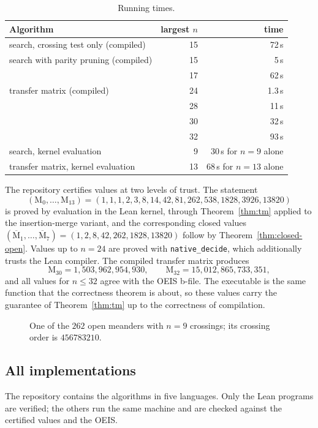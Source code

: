 \documentclass[11pt]{amsart}
\theoremstyle{definition}
\theoremstyle{remark}
\newcommand{\Open}{\mathrm{M}}
\newcommand{\Closed}{\overline{\mathrm{M}}}
\newcommand{\code}[1]{\texttt{#1}}
\begin{document}
\begin{table}[t]
\centering
\begin{tabular}{lrr}
\toprule
Algorithm & largest $n$ & time \\
\midrule
search, crossing test only (compiled)   & 15 & 72\,s \\
search with parity pruning (compiled)   & 15 & 5\,s \\
                                         & 17 & 62\,s \\
transfer matrix (compiled)              & 24 & 1.3\,s \\
                                         & 28 & 11\,s \\
                                         & 30 & 32\,s \\
                                         & 32 & 93\,s \\
\midrule
search, kernel evaluation                & 9  & 30\,s for $n=9$ alone \\
transfer matrix, kernel evaluation       & 13 & 68\,s for $n=13$ alone \\
\bottomrule
\end{tabular}
\caption{Running times.}\label{tab:perf}
\end{table}

The repository certifies values at two levels of trust. The statement
\[
  (\Open_0,\dots,\Open_{13}) = (1,1,1,2,3,8,14,42,81,262,538,1828,3926,13820)
\]
is proved by evaluation in the Lean kernel, through Theorem~\ref{thm:tm} applied to the
insertion-merge variant, and the corresponding closed values
$(\Closed_1,\dots,\Closed_7) = (1,2,8,42,262,1828,13820)$ follow by
Theorem~\ref{thm:closed-open}. Values up to $n = 24$ are proved with \code{native\_decide},
which additionally trusts the Lean compiler. The compiled transfer matrix produces
\[
  \Open_{30} = 1{,}503{,}962{,}954{,}930, \qquad \Open_{32} = 15{,}012{,}865{,}733{,}351,
\]
and all values for $n \le 32$ agree with the OEIS b-file. The executable is the same function
that the correctness theorem is about, so these values carry the guarantee of
Theorem~\ref{thm:tm} up to the correctness of compilation.

\begin{figure}[t]
\centering

\caption{One of the $262$ open meanders with $n=9$ crossings; its crossing order is $456783210$.}\label{fig:n9}
\end{figure}

\subsection{All implementations}\label{sec:implementations}
The repository contains the algorithms in five languages. Only the Lean programs are verified;
the others run the same machine and are checked against the certified values and the OEIS.
\end{document}
